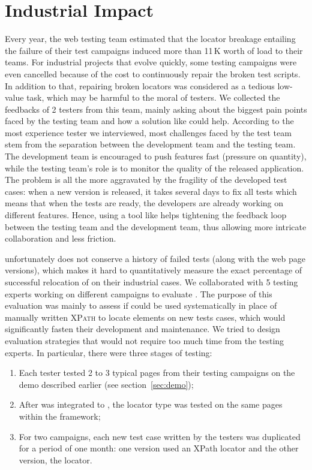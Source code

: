 \section{Industrial Impact}\label{sec:impact}
Every year, the \laredoute{} web testing team estimated that the locator breakage entailing the failure of their test campaigns induced more than 11\,K\texteuro{} worth of load to their teams.
For industrial projects that evolve quickly, some testing campaigns were even cancelled because of the cost to continuously repair the broken test scripts.
In addition to that, repairing broken locators was considered as a tedious low-value task, which may be harmful to the moral of testers. 
We collected the feedbacks of 2 testers from this team, mainly asking about the biggest pain points faced by the testing team and how a solution like \erratum could help. 
According to the most experience tester we interviewed, most challenges faced by the test team stem from the separation between the development team and the testing team.
The development team is encouraged to push features fast (pressure on quantity), while the testing team's role is to monitor the quality of the released application.
The problem is all the more aggravated by the fragility of the developed test cases: when a new version is released, it takes several days to fix all tests which means that when the tests are ready, the developers are already working on different features.
Hence, using a tool like \erratum helps tightening the feedback loop between the testing team and the development team, thus allowing more intricate collaboration and less friction.

\laredoute{} unfortunately does not conserve a history of failed tests (along with the web page versions), which makes it hard to quantitatively measure the exact percentage of successful relocation of \erratum on their industrial cases.
We collaborated with 5 testing experts working on different campaigns to evaluate \erratum. 
The purpose of this evaluation was mainly to assess if \erratum could be used systematically in place of manually written \textsc{XPath} to locate elements on new tests cases, which would significantly fasten their development and maintenance.
We tried to design evaluation strategies that would not require too much time from the testing experts.
In particular, there were three stages of testing:
\begin{enumerate}
    \item Each tester tested 2 to 3 typical pages from their testing campaigns on the demo described earlier (see section~\ref{sec:demo});
    \item After \erratum was integrated to \cerberus, the \erratum locator type was tested on the same pages within the \cerberus framework;
    \item For two campaigns, each new test case written by the testers was duplicated for a period of one month: one version used an XPath locator and the other version, the \erratum locator.
\end{enumerate}

